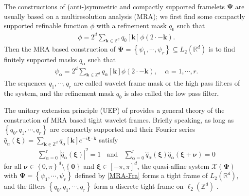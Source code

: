 \documentclass[reqno]{siamonline1116}
\numberwithin{theorem}{section}
\numberwithin{equation}{section}
\def\R{{\mathbb R}}
\def\Z{{\mathbb Z}}
\def\bk{{\boldsymbol k}}
\def\msX{{\mathscr X}}
\def\nnu{\boldsymbol{\nu}}
\def\0{{\mathbf 0}}
\def\xxi{{\boldsymbol{\xi}}}
\def\Ps{{\boldsymbol \Psi}}
\def\wh{\widehat}
\begin{document}

The constructions of (anti-)symmetric and compactly supported framelets $\Ps$ are usually based on a multiresolution analysis (MRA); we first find some compactly supported refinable function $\phi$ with a refinement mask $q_0$ such that
\begin{align}\label{MRA-RF}
\phi=2^d\sum_{\bk\in\Z^d}q_0[\bk]\phi(2\cdot-\bk).
\end{align}
Then the MRA based construction of $\Ps=\left\{\psi_1,\cdots,\psi_r\right\}\subseteq L_2(\R^d)$ is to find finitely supported masks $q_{\alpha}$ such that
\begin{align}\label{MRA-Fra}
\psi_{\alpha}=2^d\sum_{\bk\in\Z^d}q_{\alpha}[\bk]\phi(2\cdot-\bk),~~~~~\alpha=1,\cdots,r.
\end{align}
The sequences $q_1,\cdots,q_r$ are called wavelet frame mask or the high pass filters of the system, and the refinement mask $q_0$ is also called the low pass filter.

The unitary extension principle (UEP) of \cite{A.Ron1997} provides a general theory of the construction of MRA based tight wavelet frames. Briefly speaking, as long as $\left\{q_0,q_1,\cdots,q_r\right\}$ are compactly supported and their Fourier series $\wh{q}_{\alpha}(\xxi)=\sum_{\bk\in\Z^d}q_{\alpha}[\bk]e^{-i\xxi\cdot\bk}$ satisfy
\begin{align}\label{UEP}
\sum_{\alpha=0}^r\left|\wh{q}_{\alpha}(\xxi)\right|^2=1~~~~\text{and}~~~~\sum_{\alpha=0}^r\wh{q}_{\alpha}(\xxi)\overline{\wh{q}_{\alpha}(\xxi+\nnu)}=0
\end{align}
for all $\nnu\in\left\{0,\pi\right\}^d\setminus\left\{\0\right\}$ and $\xxi\in[-\pi,\pi]^d$, the quasi-affine system $\msX(\Ps)$ with $\Ps=\left\{\psi_1,\cdots,\psi_r\right\}$ defined by \cref{MRA-Fra} forms a tight frame of $L_2(\R^d)$, and the filters $\left\{q_0,q_1,\cdots,q_r\right\}$ form a discrete tight frame on $\ell_2(\Z^d)$ \cite{B.Dong2013}.
\end{document}
